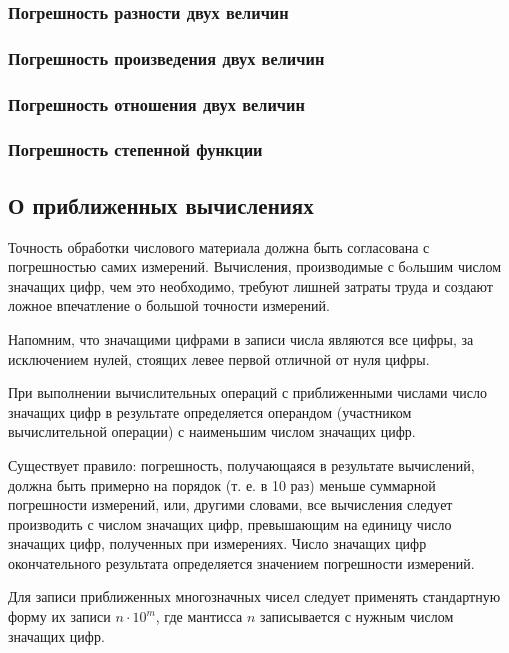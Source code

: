 \documentclass[a4paper, 12pt]{extarticle}
\begin{document}
\subsubsection{Погрешность разности двух величин}

\subsubsection{Погрешность произведения двух величин}

\subsubsection{Погрешность отношения двух величин}

\subsubsection{Погрешность степенной функции}

\subsection{О приближенных вычислениях}

Точность обработки числового материала должна быть согласована с погрешностью самих измерений. Вычисления, производимые с бoльшим числом значащих цифр, чем это необходимо, требуют лишней затраты труда и создают ложное впечатление о большой точности измерений.

Напомним, что значащими цифрами в записи числа являются все цифры, за исключением нулей, стоящих левее первой отличной от нуля цифры.

При выполнении вычислительных операций с приближенными числами число значащих цифр в результате определяется операндом (участником вычислительной операции) с наименьшим числом значащих цифр.

Существует правило: погрешность, получающаяся в результате вычислений, должна быть примерно на порядок (т. е. в 10 раз) меньше суммарной погрешности измерений, или, другими словами, все вычисления следует производить с числом значащих цифр, превышающим на единицу число значащих цифр, полученных при измерениях. Число значащих цифр окончательного результата определяется значением погрешности измерений.

Для записи приближенных многозначных чисел следует применять стандартную форму их записи $n \cdot 10^m$, где мантисса $n$ записывается с нужным числом значащих цифр.
\end{document}
